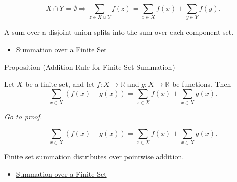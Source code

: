\begin{remark*}
\[
  X\cap Y=\emptyset
  \Longrightarrow
  \sum_{z\in X\cup Y}f(z)
  =
  \sum_{x\in X}f(x)+\sum_{y\in Y}f(y).
\]
\end{remark*}

\begin{remark*}[Interpretation]
A sum over a disjoint union splits into the sum over each component set.
\end{remark*}

\begin{dependencies}
\begin{itemize}
  \item \hyperref[def:summation-over-finite-set]{Summation over a Finite Set}
\end{itemize}
\end{dependencies}

\begin{propositionbox}{Proposition (Addition Rule for Finite Set Summation)}
\begin{proposition}
\label{prop:addition-rule-finite-set-summation}

Let \(X\) be a finite set, and let \(f:X\to\mathbb{R}\) and
\(g:X\to\mathbb{R}\) be functions. Then
\[
  \sum_{x\in X} (f(x)+g(x))
  =
  \sum_{x\in X} f(x)
  +
  \sum_{x\in X} g(x).
\]

\smallskip
\noindent
\hyperref[prf:addition-rule-finite-set-summation]{\textit{Go to proof.}}
\end{proposition}
\end{propositionbox}

\begin{remark*}
\[
  \sum_{x\in X}(f(x)+g(x))
  =
  \sum_{x\in X}f(x)+\sum_{x\in X}g(x).
\]
\end{remark*}

\begin{remark*}[Interpretation]
Finite set summation distributes over pointwise addition.
\end{remark*}

\begin{dependencies}
\begin{itemize}
  \item \hyperref[def:summation-over-finite-set]{Summation over a Finite Set}
\end{itemize}
\end{dependencies}

